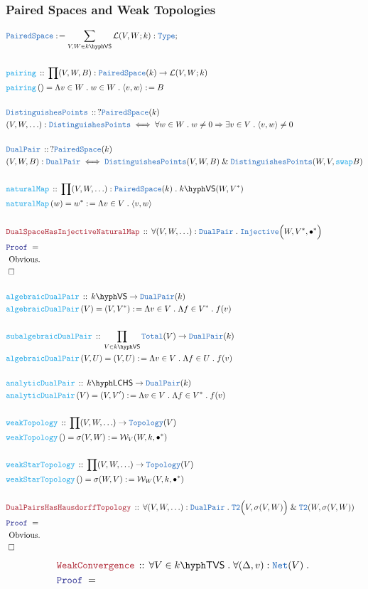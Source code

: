 \documentclass[12pt]{scrartcl}
\newcommand{\TYPE}[1]{\textcolor{NavyBlue}{\mathtt{#1}}}
\newcommand{\FUNC}[1]{\textcolor{Cerulean}{\mathtt{#1}}}
\newcommand{\LOGIC}[1]{\textcolor{Blue}{\mathtt{#1}}}
\newcommand{\THM}[1]{\textcolor{Maroon}{\mathtt{#1}}}
\renewcommand{\.}{\; . \;}
\newcommand{\de}{: \kern 0.1pc =}
\newcommand{\Act}[1]{\left( #1 \right)}
\newcommand{\Theorem}[2]{& \THM{#1} \, :: \, #2 \\ & \Proof = \\ }
\newcommand{\DeclareType}[2]{& \TYPE{#1} \, :: \, #2 \\}
\newcommand{\DefineType}[3]{& #1 : \TYPE{#2} \iff #3 \\}
\newcommand{\DeclareFunc}[2]{& \FUNC{#1} \, :: \, #2 \\}
\newcommand{\DefineNamedFunc}[4]{&  \FUNC{#1}\Act{#2} = #3 \de #4 \\}
\newcommand{\Page}[1]{ \begin{align*} #1 \end{align*}   }
\newcommand{\Explain}[1]{& \text{#1.} \\}
\renewcommand{\And}{\; \& \;}
\newcommand{\Imply}{\Rightarrow}
\newcommand{\Type}{\TYPE{Type}}
\newcommand{\Conclude}[3]{& #1 \de #2 : #3; \\}
\newcommand{\QED}{\; \square}
\newcommand{\EndProof}{& \QED \\}
\newcommand{\Proof}{\LOGIC{Proof} \; }
\newcommand{\Top}{\TYPE{Topology}}
\renewcommand{\L}{\mathcal{L}}
\newcommand{\VS}[1]{#1\hyph\mathsf{VS}} %
\renewcommand{\L}{\mathcal{L}}
\newcommand{\W}{\mathcal{W}}
\renewcommand{\L}{\mathcal{L}}
\newcommand{\PS}{\TYPE{PairedSpace}}
\newcommand{\DP}{\TYPE{DualPair}}
\newcommand{\TVS}[1]{{#1}\hyph\mathsf{TVS}}
\newcommand{\LCHS}[1]{{#1}\hyph\mathsf{LCHS}}
\begin{document}
\subsubsection{Paired Spaces and  Weak Topologies}
\Page{
	\Conclude{\PS}
	{
		\sum_{V,W\in\VS{k}} \L(V,W;k)
	}{\Type}
	\\
	\DeclareFunc{pairing}{\prod (V,W,B) : \PS(k) \to \L(V,W;k)}
	\DefineNamedFunc{pairing}{}{\Lambda v \in W \. w \in W \. \langle v, w \rangle}{B}
	\\
	\DeclareType{DistinguishesPoints}
	{
		 ? \PS(k)
	}
	\DefineType{(V,W,\ldots)}{DistinguishesPoints}
	{
		\forall w \in W \. w \neq 0 \Imply \exists  v \in V \.  \langle v, w \rangle \neq 0 
	}
	\\
	\DeclareType{DualPair}
	{
		 ? \PS(k)
	}
	\DefineType{(V,W,B)}{DualPair}
	{
		\TYPE{DistinguishesPoints}(V,W,B) \And \TYPE{DistinguishesPoints}(W,V,\FUNC{swap}B) 
	}
	\\
	\DeclareFunc{naturalMap}{\prod (V,W,\ldots) : \PS(k) \.  \VS{k}(W,V^*)}
	\DefineNamedFunc{naturalMap}{w}{ w^*}{\Lambda v \in V \. \langle v, w \rangle }
	\\
	\Theorem{DualSpaceHasInjectiveNaturalMap}
	{
		\forall (V,W,\ldots) : \DP \.       
		\TYPE{Injective}\Big(W, V^*, \bullet^*\Big)
	}
	\Explain{ Obvious}
	\EndProof
	\\
	\DeclareFunc{algebraicDualPair}{\VS{k} \to \DP(k)}
	\DefineNamedFunc{algebraicDualPair}{V}{(V,V^*)}{\Lambda v \in V \. \Lambda f \in V^* \. f(v) }
	\\
	\DeclareFunc{subalgebraicDualPair}{\prod_{V \in \VS{k}} \TYPE{Total}(V) \to \DP(k)}
	\DefineNamedFunc{algebraicDualPair}{V,U}{(V,U)}{\Lambda v \in V \. \Lambda f \in U \. f(v) }
	\\
	\DeclareFunc{analyticDualPair}{\LCHS{k} \to \DP(k)}
	\DefineNamedFunc{analyticDualPair}{V}{(V,V')}{\Lambda v \in V \. \Lambda f \in V^* \. f(v) }
	\\
	\DeclareFunc{weakTopology}{\prod (V,W,\ldots) \to \Top(V)}
	\DefineNamedFunc{weakTopology}{}{\sigma(V,W)}{\W_V(W,k,\bullet^*)}
	\\
	\DeclareFunc{weakStarTopology}{\prod (V,W,\ldots) \to \Top(V)}
	\DefineNamedFunc{weakStarTopology}{}{\sigma(W,V)}{\W_W(V,k,\bullet^*)}
	\\
	\Theorem{DualPairsHasHausdorffTopology}
	{
		\forall (V,W,\ldots) : \DP \. \TYPE{T2}\Big(V,\sigma(V,W)\Big) \And \TYPE{T2}(W,\sigma(V,W))
	}
	\Explain{ Obvious}
	\EndProof
}\Page{
	\Theorem{WeakConvergence}
	{
		\forall V \in \TVS{k} \.
		\forall (\Delta,v) : \TYPE{Net}(V) \.
}}
\end{document}
